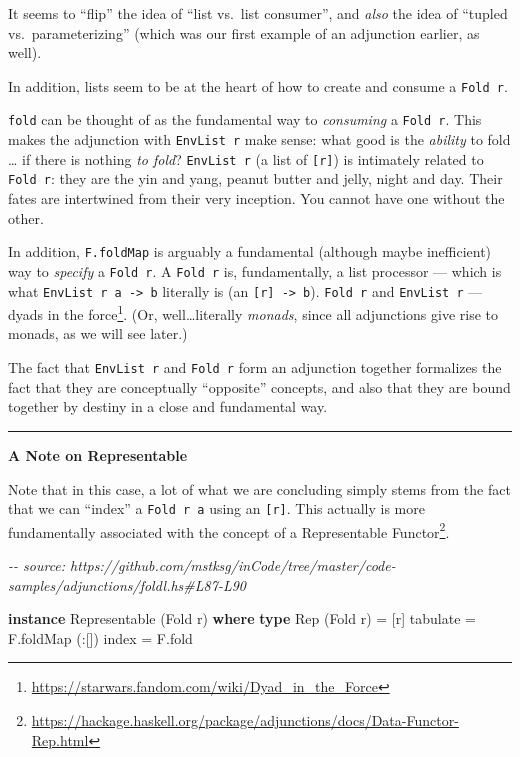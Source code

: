 \documentclass[]{article}
\newenvironment{Shaded}{}{}
\newcommand{\CommentTok}[1]{\textcolor[rgb]{0.38,0.63,0.69}{\textit{#1}}}
\newcommand{\DataTypeTok}[1]{\textcolor[rgb]{0.56,0.13,0.00}{#1}}
\newcommand{\FunctionTok}[1]{\textcolor[rgb]{0.02,0.16,0.49}{#1}}
\newcommand{\KeywordTok}[1]{\textcolor[rgb]{0.00,0.44,0.13}{\textbf{#1}}}
\newcommand{\NormalTok}[1]{#1}
\newcommand{\OperatorTok}[1]{\textcolor[rgb]{0.40,0.40,0.40}{#1}}
\newcommand{\OtherTok}[1]{\textcolor[rgb]{0.00,0.44,0.13}{#1}}
\renewcommand{\href}[2]{#2\footnote{\url{#1}}}
\begin{document}
It seems to ``flip'' the idea of ``list vs.~list consumer'', and \emph{also} the
idea of ``tupled vs.~parameterizing'' (which was our first example of an
adjunction earlier, as well).

In addition, lists seem to be at the heart of how to create and consume a
\texttt{Fold\ r}.

\texttt{fold} can be thought of as the fundamental way to \emph{consuming} a
\texttt{Fold\ r}. This makes the adjunction with \texttt{EnvList\ r} make sense:
what good is the \emph{ability} to fold \ldots{} if there is nothing \emph{to
fold}? \texttt{EnvList\ r} (a list of \texttt{{[}r{]}}) is intimately related to
\texttt{Fold\ r}: they are the yin and yang, peanut butter and jelly, night and
day. Their fates are intertwined from their very inception. You cannot have one
without the other.

In addition, \texttt{F.foldMap} is arguably a fundamental (although maybe
inefficient) way to \emph{specify} a \texttt{Fold\ r}. A \texttt{Fold\ r} is,
fundamentally, a list processor --- which is what
\texttt{EnvList\ r\ a\ -\textgreater{}\ b} literally is (an
\texttt{{[}r{]}\ -\textgreater{}\ b}). \texttt{Fold\ r} and \texttt{EnvList\ r}
--- \href{https://starwars.fandom.com/wiki/Dyad_in_the_Force}{dyads in the
force}. (Or, well\ldots literally \emph{monads}, since all adjunctions give rise
to monads, as we will see later.)

The fact that \texttt{EnvList\ r} and \texttt{Fold\ r} form an adjunction
together formalizes the fact that they are conceptually ``opposite'' concepts,
and also that they are bound together by destiny in a close and fundamental way.

\begin{center}\rule{0.5\linewidth}{0.5pt}\end{center}

\textbf{A Note on Representable}

Note that in this case, a lot of what we are concluding simply stems from the
fact that we can ``index'' a \texttt{Fold\ r\ a} using an \texttt{{[}r{]}}. This
actually is more fundamentally associated with the concept of a
\href{https://hackage.haskell.org/package/adjunctions/docs/Data-Functor-Rep.html}{Representable
Functor}.

\begin{Shaded}
\begin{Highlighting}[]
\CommentTok{{-}{-} source: https://github.com/mstksg/inCode/tree/master/code{-}samples/adjunctions/foldl.hs\#L87{-}L90}

\KeywordTok{instance} \DataTypeTok{Representable}\NormalTok{ (}\DataTypeTok{Fold}\NormalTok{ r) }\KeywordTok{where}
    \KeywordTok{type} \DataTypeTok{Rep}\NormalTok{ (}\DataTypeTok{Fold}\NormalTok{ r) }\OtherTok{=}\NormalTok{ [r]}
\NormalTok{    tabulate }\OtherTok{=}\NormalTok{ F.foldMap (}\OperatorTok{:}\NormalTok{[])}
    \FunctionTok{index}    \OtherTok{=}\NormalTok{ F.fold}
\end{Highlighting}
\end{Shaded}
\end{document}
